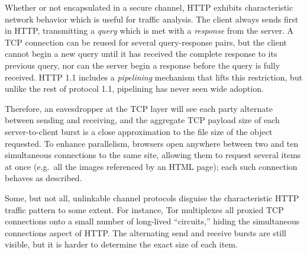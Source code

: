 \documentclass{zarticle}
\begin{document}
Whether or not encapsulated in a secure channel, HTTP exhibits
characteristic network behavior which is useful for traffic analysis.
The client always sends first in HTTP, transmitting a \emph{query}
which is met with a \emph{response} from the server.  A TCP connection
can be reused for several query-response pairs, but the client cannot
begin a new query until it has received the complete response to its
previous query, nor can the server begin a response before the query
is fully received.  HTTP 1.1 includes a \emph{pipelining} mechanism
that lifts this restriction, but unlike the rest of protocol 1.1,
pipelining has never seen wide adoption.

Therefore, an eavesdropper at the TCP layer will see each party
alternate between sending and receiving, and the aggregate TCP payload
size of each server-to-client burst is a close approximation to the
file size of the object requested.  To enhance parallelism, browsers
open anywhere between two and ten simultaneous connections to the same
site, allowing them to request several items at once (e.g.\ all the
images referenced by an HTML page); each such connection behaves as
described.

Some, but not all, unlinkable channel protocols disguise the
characteristic HTTP traffic pattern to some extent.  For instance, Tor
multiplexes all proxied TCP connections onto a small number of
long-lived “circuits,” hiding the simultaneous connections aspect of
HTTP.  The alternating send and receive bursts are still visible, but
it is harder to determine the exact size of each item.



\end{document}
